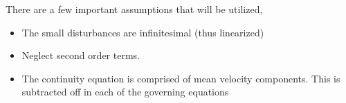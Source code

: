 There are a few important assumptions that will be utilized,
\begin{itemize}
	\item The small disturbances are infinitesimal (thus linearized)
	\item Neglect second order terms.
	\item The continuity equation is comprised of mean velocity components. This is subtracted off in each of the governing equations
\end{itemize}



